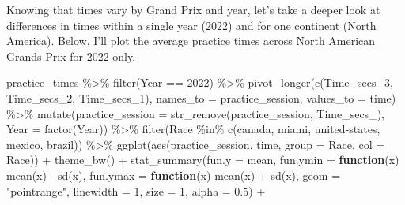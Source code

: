 \documentclass[
]{book}
\newenvironment{Shaded}{\begin{snugshade}}{\end{snugshade}}
\newcommand{\AttributeTok}[1]{\textcolor[rgb]{0.77,0.63,0.00}{#1}}
\newcommand{\ControlFlowTok}[1]{\textcolor[rgb]{0.13,0.29,0.53}{\textbf{#1}}}
\newcommand{\DecValTok}[1]{\textcolor[rgb]{0.00,0.00,0.81}{#1}}
\newcommand{\FloatTok}[1]{\textcolor[rgb]{0.00,0.00,0.81}{#1}}
\newcommand{\FunctionTok}[1]{\textcolor[rgb]{0.00,0.00,0.00}{#1}}
\newcommand{\NormalTok}[1]{#1}
\newcommand{\SpecialCharTok}[1]{\textcolor[rgb]{0.00,0.00,0.00}{#1}}
\newcommand{\StringTok}[1]{\textcolor[rgb]{0.31,0.60,0.02}{#1}}
\begin{document}
Knowing that times vary by Grand Prix and year, let's take a deeper look at differences in times within a single year (2022) and for one continent (North America). Below, I'll plot the average practice times across North American Grands Prix for 2022 only.

\begin{Shaded}
\begin{Highlighting}[]
\NormalTok{practice\_times }\SpecialCharTok{\%\textgreater{}\%}
  \FunctionTok{filter}\NormalTok{(Year }\SpecialCharTok{==} \DecValTok{2022}\NormalTok{) }\SpecialCharTok{\%\textgreater{}\%} 
  \FunctionTok{pivot\_longer}\NormalTok{(}\FunctionTok{c}\NormalTok{(Time\_secs\_3, Time\_secs\_2, Time\_secs\_1), }\AttributeTok{names\_to =} \StringTok{\textquotesingle{}practice\_session\textquotesingle{}}\NormalTok{, }\AttributeTok{values\_to =} \StringTok{\textquotesingle{}time\textquotesingle{}}\NormalTok{) }\SpecialCharTok{\%\textgreater{}\%}
  \FunctionTok{mutate}\NormalTok{(}\AttributeTok{practice\_session =} \FunctionTok{str\_remove}\NormalTok{(practice\_session, }\StringTok{\textquotesingle{}Time\_secs\_\textquotesingle{}}\NormalTok{),}
         \AttributeTok{Year =} \FunctionTok{factor}\NormalTok{(Year)) }\SpecialCharTok{\%\textgreater{}\%}
  \FunctionTok{filter}\NormalTok{(Race }\SpecialCharTok{\%in\%} \FunctionTok{c}\NormalTok{(}\StringTok{\textquotesingle{}canada\textquotesingle{}}\NormalTok{, }\StringTok{\textquotesingle{}miami\textquotesingle{}}\NormalTok{, }\StringTok{\textquotesingle{}united{-}states\textquotesingle{}}\NormalTok{, }\StringTok{\textquotesingle{}mexico\textquotesingle{}}\NormalTok{, }\StringTok{\textquotesingle{}brazil\textquotesingle{}}\NormalTok{)) }\SpecialCharTok{\%\textgreater{}\%} 
  \FunctionTok{ggplot}\NormalTok{(}\FunctionTok{aes}\NormalTok{(practice\_session, time, }
               \AttributeTok{group =}\NormalTok{ Race, }\AttributeTok{col =}\NormalTok{ Race)) }\SpecialCharTok{+}
  \FunctionTok{theme\_bw}\NormalTok{() }\SpecialCharTok{+}
  \FunctionTok{stat\_summary}\NormalTok{(}\AttributeTok{fun.y =}\NormalTok{ mean,}
               \AttributeTok{fun.ymin =} \ControlFlowTok{function}\NormalTok{(x) }\FunctionTok{mean}\NormalTok{(x) }\SpecialCharTok{{-}} \FunctionTok{sd}\NormalTok{(x), }
               \AttributeTok{fun.ymax =} \ControlFlowTok{function}\NormalTok{(x) }\FunctionTok{mean}\NormalTok{(x) }\SpecialCharTok{+} \FunctionTok{sd}\NormalTok{(x), }
               \AttributeTok{geom =} \StringTok{"pointrange"}\NormalTok{, }
               \AttributeTok{linewidth =} \DecValTok{1}\NormalTok{, }\AttributeTok{size =} \DecValTok{1}\NormalTok{, }\AttributeTok{alpha =} \FloatTok{0.5}\NormalTok{) }\SpecialCharTok{+}

\end{Highlighting}
\end{Shaded}
\end{document}
